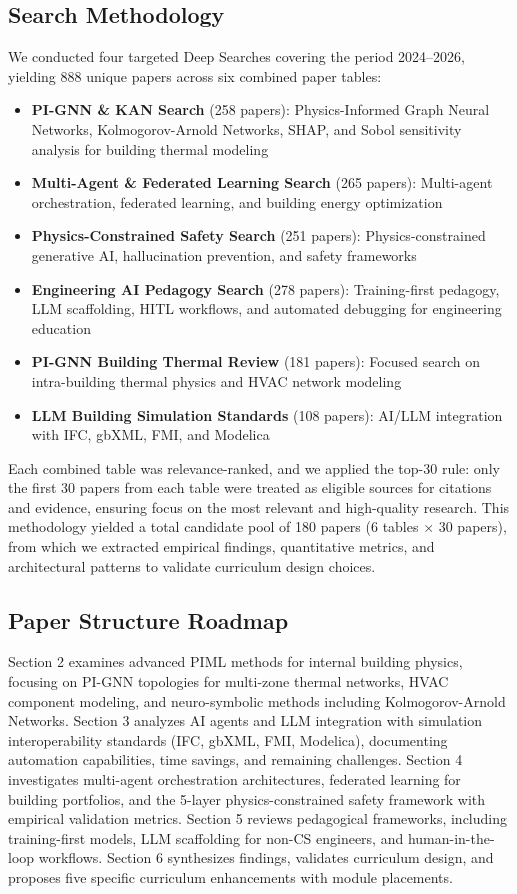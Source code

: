 \documentclass[12pt,a4paper]{article}
\begin{document}
\subsection{Search Methodology}
We conducted four targeted Deep Searches covering the period 2024--2026, yielding 888 unique papers across six combined paper tables:
\begin{itemize}
  \item \textbf{PI-GNN \& KAN Search} (258 papers): Physics-Informed Graph Neural Networks, Kolmogorov-Arnold Networks, SHAP, and Sobol sensitivity analysis for building thermal modeling
  \item \textbf{Multi-Agent \& Federated Learning Search} (265 papers): Multi-agent orchestration, federated learning, and building energy optimization
  \item \textbf{Physics-Constrained Safety Search} (251 papers): Physics-constrained generative AI, hallucination prevention, and safety frameworks
  \item \textbf{Engineering AI Pedagogy Search} (278 papers): Training-first pedagogy, LLM scaffolding, HITL workflows, and automated debugging for engineering education
  \item \textbf{PI-GNN Building Thermal Review} (181 papers): Focused search on intra-building thermal physics and HVAC network modeling
  \item \textbf{LLM Building Simulation Standards} (108 papers): AI/LLM integration with IFC, gbXML, FMI, and Modelica
\end{itemize}
Each combined table was relevance-ranked, and we applied the top-30 rule: only the first 30 papers from each table were treated as eligible sources for citations and evidence, ensuring focus on the most relevant and high-quality research. This methodology yielded a total candidate pool of 180 papers (6 tables × 30 papers), from which we extracted empirical findings, quantitative metrics, and architectural patterns to validate curriculum design choices.
\subsection{Paper Structure Roadmap}
Section 2 examines advanced PIML methods for internal building physics, focusing on PI-GNN topologies for multi-zone thermal networks, HVAC component modeling, and neuro-symbolic methods including Kolmogorov-Arnold Networks. Section 3 analyzes AI agents and LLM integration with simulation interoperability standards (IFC, gbXML, FMI, Modelica), documenting automation capabilities, time savings, and remaining challenges. Section 4 investigates multi-agent orchestration architectures, federated learning for building portfolios, and the 5-layer physics-constrained safety framework with empirical validation metrics. Section 5 reviews pedagogical frameworks, including training-first models, LLM scaffolding for non-CS engineers, and human-in-the-loop workflows. Section 6 synthesizes findings, validates curriculum design, and proposes five specific curriculum enhancements with module placements.
\end{document}
